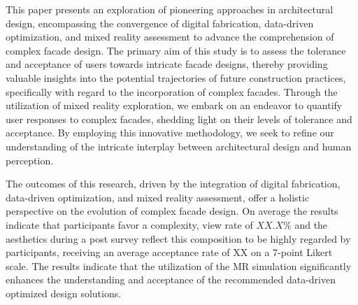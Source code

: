 This paper presents an exploration of pioneering approaches in architectural design, encompassing the convergence of digital fabrication, data-driven optimization, and mixed reality assessment to advance the comprehension of complex facade design. The primary aim of this study is to assess the tolerance and acceptance of users towards intricate facade designs, thereby providing valuable insights into the potential trajectories of future construction practices, specifically with regard to the incorporation of complex facades. Through the utilization of mixed reality exploration, we embark on an endeavor to quantify user responses to complex facades, shedding light on their levels of tolerance and acceptance. By employing this innovative methodology, we seek to refine our understanding of the intricate interplay between architectural design and human perception.

The outcomes of this research, driven by the integration of digital fabrication, data-driven optimization, and mixed reality assessment, offer a holistic perspective on the evolution of complex facade design.
On average the results indicate that participants favor a complexity, view rate of \(XX.X\%\) and the aesthetics during a post survey reflect this composition to be  highly regarded by participants, receiving an average acceptance rate of XX on a 7-point Likert scale.
The results indicate that the utilization of the MR simulation significantly enhances the understanding and acceptance of the recommended data-driven optimized design solutions.

        

